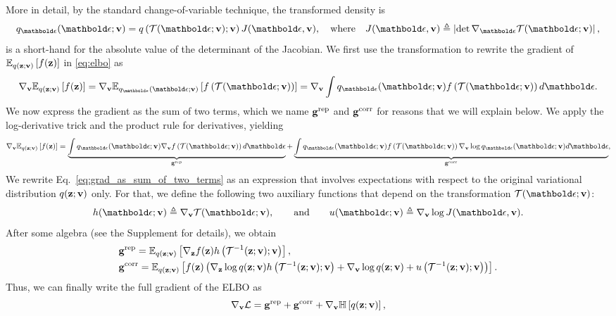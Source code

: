 More in detail, by the standard change-of-variable technique, the transformed density is
\begin{equation}\label{eq:q_eps}
	q_{\beps}(\beps;\bv)=q\left(\Tcal(\beps;\bv);\bv\right)J(\beps,\bv),\quad {\rm where} \quad
	J(\beps,\bv)\triangleq\left|\det \nabla_{\beps}\Tcal(\beps;\bv)\right|,
\end{equation}
is a short-hand for the absolute value of the determinant of the Jacobian. We first use the transformation to rewrite the gradient of $\mathbb{E}_{q(\mathbf{z};\mathbf{v})}\left[f(\mathbf{z})\right]$ in \eqref{eq:elbo} as
\begin{equation}
	\begin{split}
    	\nabla_{\bv} \E{q(\bz;\bv)}{f(\bz)} = \nabla_{\bv}\E{q_{\beps}(\beps;\bv)}{f\left(\Tcal(\beps;\bv)\right)} = \nabla_{\bv}\int q_{\beps}(\beps;\bv)f\left(\Tcal(\beps;\bv)\right) d\beps.
	\end{split}
\end{equation}
We now express the gradient as the sum of two terms, which we name $\mathbf{g}^{\textrm{rep}}$ and $\mathbf{g}^{\textrm{corr}}$ for reasons that we will explain below. We apply the log-derivative trick and the product rule for derivatives, yielding
\begin{equation}\label{eq:grad_as_sum_of_two_terms}
	\begin{split}
    	\nabla_{\bv} \E{q(\bz;\bv)}{f(\bz)} = \underbrace{\int q_{\beps}(\beps;\bv)\nabla_{\bv}f\left(\Tcal(\beps;\bv)\right)d\beps}_{\bg^{\textrm{rep}}} +
    	\underbrace{\int q_{\beps}(\beps;\bv)f\left(\Tcal(\beps;\bv)\right)\nabla_{\bv} \log q_{\beps}(\beps;\bv) d\beps}_{\bg^{\textrm{corr}}},
	\end{split}
\end{equation}
We rewrite Eq.~\ref{eq:grad_as_sum_of_two_terms} as an expression that involves expectations with respect to the original variational distribution $q(\mathbf{z};\mathbf{v})$ only. For that, we define the following two auxiliary functions that depend on the transformation $\Tcal(\beps;\bv)$:
\begin{equation}\label{eq:hfun_ufun}
    \hfun(\beps;\bv)\triangleq \nabla_{\bv} \Tcal(\beps;\bv),
    \qquad \textrm{and} \qquad
    \ufun(\beps;\bv)\triangleq \nabla_{\bv} \log J(\beps,\bv).
\end{equation}
After some algebra (see the Supplement for details), we obtain
\begin{equation}\label{eq:grep_gcorr}
  \begin{split}
      & \mathbf{g}^{\textrm{rep}} = \mathbb{E}_{q(\mathbf{z};\mathbf{v})}\left[\nabla_{\mathbf{z}}f(\mathbf{z}) h\left( \mathcal{T}^{-1}(\mathbf{z};\mathbf{v});\mathbf{v} \right)\right],\\
      & \mathbf{g}^{\textrm{corr}} = \mathbb{E}_{q(\mathbf{z};\mathbf{v})}\left[f(\mathbf{z}) \left(\nabla_{\mathbf{z}}\log q(\mathbf{z};\mathbf{v}) h\left(\mathcal{T}^{-1}(\mathbf{z};\mathbf{v});\mathbf{v}\right) + \nabla_{\mathbf{v}}\log q(\mathbf{z};\mathbf{v})+ u\left(\mathcal{T}^{-1}(\mathbf{z};\mathbf{v});\mathbf{v} \right) \right)\right].
  \end{split}
\end{equation}
Thus, we can finally write the full gradient of the \gls{ELBO} as
\begin{equation}\label{eq:corrected_reparam}
	\nabla_{\mathbf{v}}\mathcal{L} = \mathbf{g}^{\textrm{rep}} + \mathbf{g}^{\textrm{corr}} + \nabla_{\mathbf{v}}\mathbb{H}\left[q(\mathbf{z};\mathbf{v})\right],
\end{equation}

